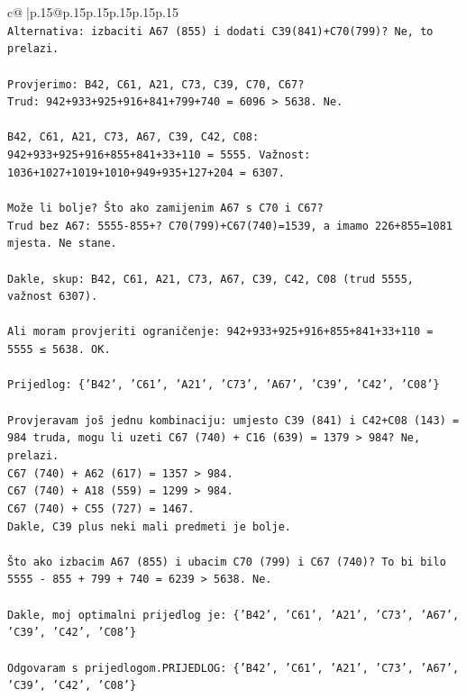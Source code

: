 \documentclass{article}
\begin{document}
{\begin{supertabular}{c@{$\;$}|p{.15\linewidth}@{}p{.15\linewidth}p{.15\linewidth}p{.15\linewidth}p{.15\linewidth}p{.15\linewidth}}
{{{\\ 
\texttt{Alternativa: izbaciti A67 (855) i dodati C39(841)+C70(799)? Ne, to prelazi.} \\
\\ 
\texttt{Provjerimo: B42, C61, A21, C73, C39, C70, C67?} \\
\texttt{Trud: 942+933+925+916+841+799+740 = 6096 > 5638. Ne.} \\
\\ 
\texttt{B42, C61, A21, C73, A67, C39, C42, C08:} \\
\texttt{942+933+925+916+855+841+33+110 = 5555. Važnost: 1036+1027+1019+1010+949+935+127+204 = 6307.} \\
\\ 
\texttt{Može li bolje? Što ako zamijenim A67 s C70 i C67?} \\
\texttt{Trud bez A67: 5555{-}855+? C70(799)+C67(740)=1539, a imamo 226+855=1081 mjesta. Ne stane.} \\
\\ 
\texttt{Dakle, skup: B42, C61, A21, C73, A67, C39, C42, C08 (trud 5555, važnost 6307).} \\
\\ 
\texttt{Ali moram provjeriti ograničenje: 942+933+925+916+855+841+33+110 = 5555 ≤ 5638. OK.} \\
\\ 
\texttt{Prijedlog: \{'B42', 'C61', 'A21', 'C73', 'A67', 'C39', 'C42', 'C08'\}} \\
\\ 
\texttt{Provjeravam još jednu kombinaciju: umjesto C39 (841) i C42+C08 (143) = 984 truda, mogu li uzeti C67 (740) + C16 (639) = 1379 > 984? Ne, prelazi.} \\
\texttt{C67 (740) + A62 (617) = 1357 > 984.} \\
\texttt{C67 (740) + A18 (559) = 1299 > 984.} \\
\texttt{C67 (740) + C55 (727) = 1467.} \\
\texttt{Dakle, C39 plus neki mali predmeti je bolje.} \\
\\ 
\texttt{Što ako izbacim A67 (855) i ubacim C70 (799) i C67 (740)? To bi bilo 5555 {-} 855 + 799 + 740 = 6239 > 5638. Ne.} \\
\\ 
\texttt{Dakle, moj optimalni prijedlog je: \{'B42', 'C61', 'A21', 'C73', 'A67', 'C39', 'C42', 'C08'\}} \\
\\ 
\texttt{Odgovaram s prijedlogom.PRIJEDLOG: \{'B42', 'C61', 'A21', 'C73', 'A67', 'C39', 'C42', 'C08'\}} \\
            }
        }
    }
     \\ \\


\end{supertabular}}
\end{document}
